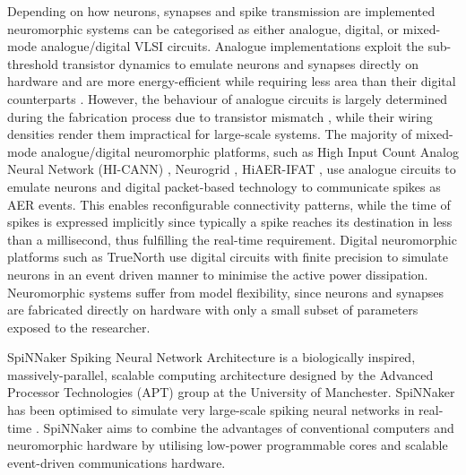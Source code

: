 Depending on how neurons, synapses and spike transmission are implemented neuromorphic systems can be categorised as either analogue, digital, or mixed-mode analogue/digital VLSI circuits. Analogue implementations exploit the sub-threshold transistor dynamics to emulate neurons and synapses directly on hardware \citep{giacom} and are more energy-efficient while requiring less area than their digital counterparts \citep{temamanalogdigital}. However, the behaviour of analogue circuits is largely determined during the fabrication process due to transistor mismatch \citep{giacom,analoguemismatch,bernabeDACsynapses}, while their wiring densities render them impractical for large-scale systems. The majority of mixed-mode analogue/digital neuromorphic platforms, such as High Input Count Analog Neural Network (HI-CANN) \citep{Schemmel_etal10}, Neurogrid \citep{Benjamin_etal14}, HiAER-IFAT \citep{gert}, use analogue circuits to emulate neurons and digital packet-based technology to communicate spikes as AER events. This enables reconfigurable connectivity patterns, while the time of spikes is expressed implicitly since typically a spike reaches its destination in less than a millisecond, thus fulfilling the real-time requirement. Digital neuromorphic platforms such as TrueNorth \citep{Merolla08082014} use digital circuits with finite precision to simulate neurons in an event driven manner to minimise the active power dissipation. Neuromorphic systems suffer from model flexibility, since neurons and synapses are fabricated directly on hardware with only a small subset of parameters exposed to the researcher. 

SpiNNaker Spiking Neural Network Architecture is a biologically inspired, massively-parallel, scalable computing architecture designed by the Advanced Processor Technologies (APT) group at the University of Manchester. SpiNNaker has been optimised to simulate very large-scale spiking neural networks in real-time \citep{spiNNakerProject}. SpiNNaker aims to combine the advantages of conventional computers and neuromorphic hardware by utilising low-power programmable cores and scalable event-driven communications hardware.

